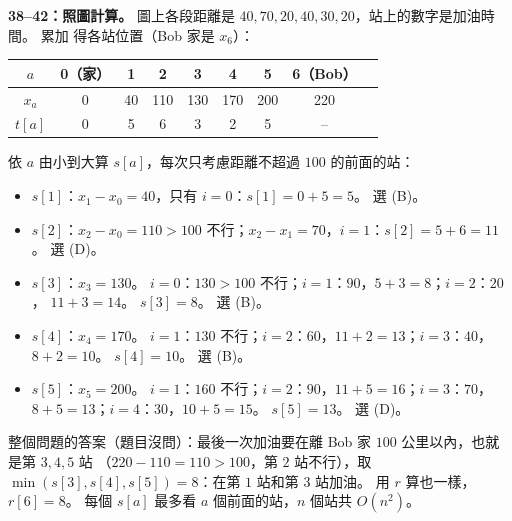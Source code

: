 \begin{pastsoln}
\textbf{38--42：照圖計算。} 圖上各段距離是 $40, 70, 20, 40, 30, 20$，站上的數字是加油時間。 累加
得各站位置（Bob 家是 $x_6$）：
\begin{center}
\begin{tabular}{ccccccccc}
\toprule
$a$ & 0（家） & 1 & 2 & 3 & 4 & 5 & 6（Bob） \\
\midrule
$x_a$ & 0 & 40 & 110 & 130 & 170 & 200 & 220 \\
$t[a]$ & 0 & 5 & 6 & 3 & 2 & 5 & -- \\
\bottomrule
\end{tabular}
\end{center}
依 $a$ 由小到大算 $s[a]$，每次只考慮距離不超過 $100$ 的前面的站：
\begin{itemize}
\item $s[1]$：$x_1 - x_0 = 40$，只有 $i = 0$：$s[1] = 0 + 5 = 5$。 選 (B)。
\item $s[2]$：$x_2 - x_0 = 110 > 100$ 不行；$x_2 - x_1 = 70$，$i = 1$：$s[2] = 5 + 6 = 11$。
選 (D)。
\item $s[3]$：$x_3 = 130$。 $i = 0$：$130 > 100$ 不行；$i = 1$：$90$，$5 + 3 = 8$；$i = 2$：$20$，
$11 + 3 = 14$。 $s[3] = 8$。 選 (B)。
\item $s[4]$：$x_4 = 170$。 $i = 1$：$130$ 不行；$i = 2$：$60$，$11 + 2 = 13$；$i = 3$：$40$，
$8 + 2 = 10$。 $s[4] = 10$。 選 (B)。
\item $s[5]$：$x_5 = 200$。 $i = 1$：$160$ 不行；$i = 2$：$90$，$11 + 5 = 16$；$i = 3$：$70$，
$8 + 5 = 13$；$i = 4$：$30$，$10 + 5 = 15$。 $s[5] = 13$。 選 (D)。
\end{itemize}

整個問題的答案（題目沒問）：最後一次加油要在離 Bob 家 $100$ 公里以內，也就是第 $3, 4, 5$ 站
（$220 - 110 = 110 > 100$，第 $2$ 站不行），取 $\min(s[3], s[4], s[5]) = 8$：在第 $1$ 站和第 $3$
站加油。 用 $r$ 算也一樣，$r[6] = 8$。 每個 $s[a]$ 最多看 $a$ 個前面的站，$n$ 個站共 $O(n^2)$。
\end{pastsoln}
